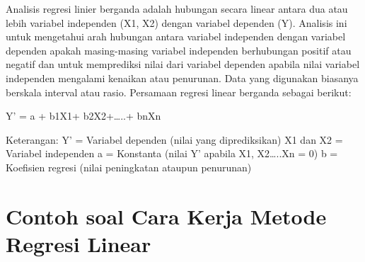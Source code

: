 Analisis regresi linier berganda adalah hubungan secara linear antara dua atau lebih variabel independen (X1, X2) dengan variabel dependen (Y). Analisis ini untuk mengetahui arah hubungan antara variabel independen dengan variabel dependen apakah masing-masing variabel independen berhubungan positif atau negatif dan untuk memprediksi nilai dari variabel dependen apabila nilai variabel independen mengalami kenaikan atau penurunan. Data yang digunakan biasanya berskala interval atau rasio.\citep{smadi2012least}
                        Persamaan regresi linear berganda sebagai berikut:

Y’ = a + b1X1+ b2X2+…..+ bnXn

Keterangan:
Y’                    =   Variabel dependen (nilai yang diprediksikan)
X1 dan X2      =   Variabel independen
a                      =   Konstanta (nilai Y’ apabila X1, X2…..Xn = 0)
b                            =    Koefisien regresi (nilai peningkatan ataupun penurunan)

\newpage \section{Contoh soal Cara Kerja Metode Regresi Linear}
